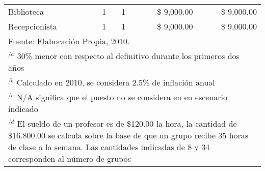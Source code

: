 \begin{table}[h]
\begin{tabular}{l|c|c|r|r}
        Biblioteca                       & 1 &  1 & \$  9,000.00 & \$  9,000.00 \\
        Recepcionista                    & 1 &  1 & \$  9,000.00 & \$  9,000.00 \\
        \hline
        \multicolumn{5}{l}{\footnotesize Fuente: Elaboración Propia, 2010.} \\
        \multicolumn{5}{p{5.5in}}{$^{/a}$ 30\% menor con respecto al definitivo durante los primeros dos años} \\
        \multicolumn{5}{p{5.5in}}{$^{/b}$ Calculado en 2010, se considera 2.5\% de inflación anual} \\
        \multicolumn{5}{p{5.5in}}{$^{/c}$ N/A significa que el puesto no se considera en en escenario indicado} \\
        \multicolumn{5}{p{5.5in}}{$^{/d}$ El sueldo de un profesor es de \$120.00 la hora, la cantidad de \$16.800.00 se calcula sobre la base de que un grupo recibe 35 horas de clase a la semana. Las cantidades indicadas de 8 y 34 corresponden al número de grupos}
    \end{tabular}
\end{table}
